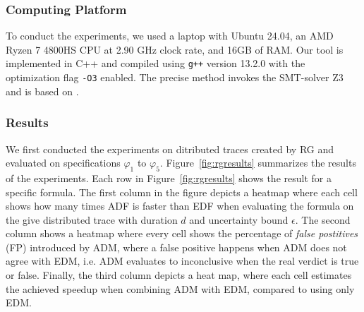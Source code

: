 \subsubsection{Computing Platform}

To conduct the experiments, we used a laptop with Ubuntu 24.04, an AMD Ryzen 7 4800HS CPU at 2.90 GHz clock rate, and 16GB of RAM.
Our tool is implemented in C++ and compiled using \texttt{g++} version 13.2.0 with the optimization flag \texttt{-O3} enabled.
The precise method invokes the SMT-solver Z3 \cite{MouraB08} and is based on \cite{MomtazAB23}.

\subsubsection{Results}

We first conducted the experiments on ditributed traces created by RG and evaluated on specifications $\varphi_1$ to $\varphi_5$. Figure~\ref{fig:rgresults} summarizes the results of the experiments. Each row in Figure~\ref{fig:rgresults} shows the result for a specific formula. The first column in the figure depicts a heatmap where each cell shows how many times ADF is faster than EDF when evaluating the formula on the give distributed trace with duration $d$ and uncertainty bound $\epsilon$. The second column shows a heatmap where every cell shows the percentage of \emph{false postitives} (FP) introduced by ADM, where a false positive happens when ADM does not agree with EDM, i.e. ADM evaluates to inconclusive when the real verdict is true or false. Finally, the third column depicts a heat map, where each cell estimates the achieved speedup when combining ADM with EDM, compared to using only EDM.

